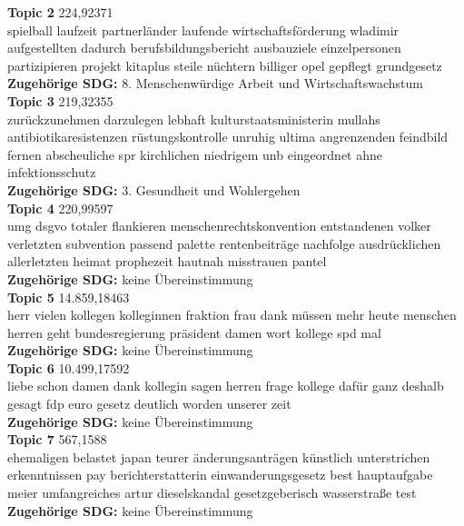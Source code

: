 \documentclass[letterpaper]{article}
\begin{document}
\textbf{Topic 2} 224,92371 \\
spielball laufzeit partnerländer laufende wirtschaftsförderung wladimir aufgestellten dadurch berufsbildungsbericht ausbauziele einzelpersonen partizipieren projekt kitaplus steile nüchtern billiger opel gepflegt grundgesetz   \\
  \textbf{Zugehörige SDG:} 8. Menschenwürdige Arbeit und Wirtschaftswachstum \\

\textbf{Topic 3} 219,32355 \\
zurückzunehmen darzulegen lebhaft kulturstaatsministerin mullahs antibiotikaresistenzen rüstungskontrolle unruhig ultima angrenzenden feindbild fernen abscheuliche spr kirchlichen niedrigem unb eingeordnet ahne infektionsschutz   \\
  \textbf{Zugehörige SDG:} 3. Gesundheit und Wohlergehen \\
    
\textbf{Topic 4} 220,99597 \\
umg dsgvo totaler flankieren menschenrechtskonvention entstandenen volker verletzten subvention passend palette rentenbeiträge nachfolge ausdrücklichen allerletzten heimat prophezeit hautnah misstrauen pantel    \\
  \textbf{Zugehörige SDG:} keine Übereinstimmung \\   

\textbf{Topic 5} 14.859,18463 \\
herr vielen kollegen kolleginnen fraktion frau dank müssen mehr heute menschen herren geht bundesregierung präsident damen wort kollege spd mal   \\
  \textbf{Zugehörige SDG:} keine Übereinstimmung \\
   
\textbf{Topic 6} 10.499,17592 \\
liebe schon damen dank kollegin sagen herren frage kollege dafür ganz deshalb gesagt fdp euro gesetz deutlich worden unserer zeit    \\
  \textbf{Zugehörige SDG:} keine Übereinstimmung \\    

\textbf{Topic 7} 567,1588 \\
ehemaligen belastet japan teurer änderungsanträgen künstlich unterstrichen erkenntnissen pay berichterstatterin einwanderungsgesetz best hauptaufgabe meier umfangreiches artur dieselskandal gesetzgeberisch wasserstraße test   \\
  \textbf{Zugehörige SDG:} keine Übereinstimmung \\
  
\end{document}
